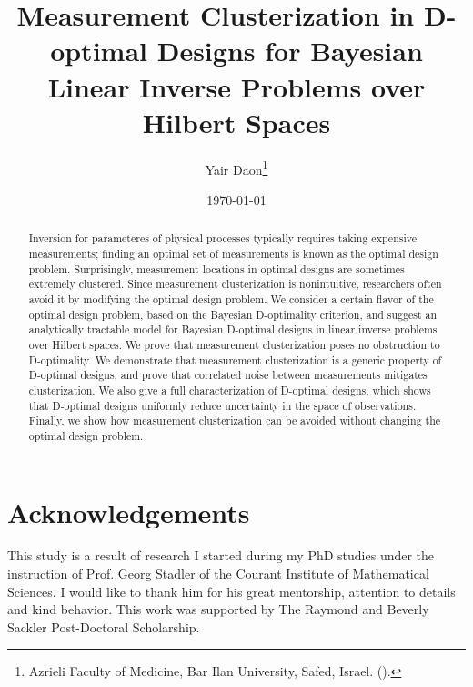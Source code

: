 \documentclass{siamonline220329}
\title{Measurement Clusterization in D-optimal Designs for Bayesian Linear
  Inverse Problems over Hilbert Spaces}
\author{Yair Daon\thanks{Azrieli Faculty of Medicine, Bar Ilan
    University, Safed, Israel.  (\email{yair.daon@gmail.com}).}}
\date{\today}
\begin{document}
\maketitle
\begin{abstract}
  Inversion for parameteres of physical processes typically requires
  taking expensive measurements; finding an optimal set of
  measurements is known as the optimal design problem. Surprisingly,
  measurement locations in optimal designs are sometimes extremely
  clustered. Since measurement clusterization is nonintuitive,
  researchers often avoid it by modifying the optimal design
  problem. We consider a certain flavor of the optimal design problem,
  based on the Bayesian D-optimality criterion, and suggest an
  analytically tractable model for Bayesian D-optimal designs in
  linear inverse problems over Hilbert spaces. We prove that
  measurement clusterization poses no obstruction to D-optimality. We
  demonstrate that measurement clusterization is a generic property of
  D-optimal designs, and prove that correlated noise between
  measurements mitigates clusterization. We also give a full
  characterization of D-optimal designs, which shows that D-optimal
  designs uniformly reduce uncertainty in the space of
  observations. Finally, we show how measurement clusterization can be
  avoided without changing the optimal design problem.
\end{abstract}




\maketitle










\section{Acknowledgements}
This study is a result of research I started during my PhD studies
under the instruction of Prof. Georg Stadler of the Courant Institute
of Mathematical Sciences. I would like to thank him for his great
mentorship, attention to details and kind behavior. This work was
supported by The Raymond and Beverly Sackler Post-Doctoral
Scholarship.
\end{document}
